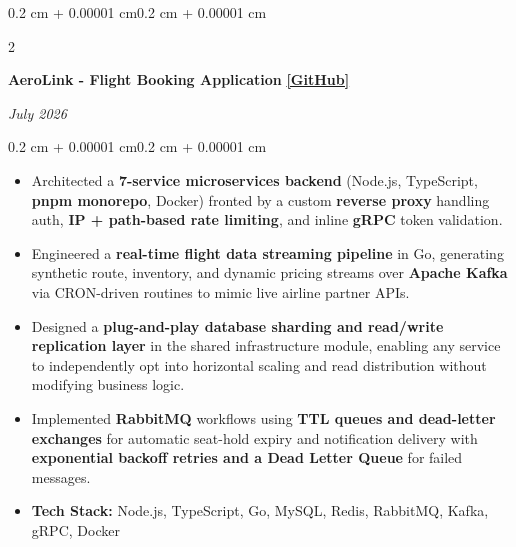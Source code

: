 \documentclass[10pt, letterpaper]{article}
\newenvironment{highlights}{
    \begin{itemize}[
        topsep=0.06 cm,
        parsep=0.06 cm,
        partopsep=0pt,
        itemsep=0pt,
        leftmargin=0.4 cm + 10pt
    ]
}{
    \end{itemize}
}
\newenvironment{onecolentry}{
    \begin{adjustwidth}{0.2 cm + 0.00001 cm}{0.2 cm + 0.00001 cm}
}{
    \end{adjustwidth}
}
\newenvironment{twocolentry}[2][]{
    \onecolentry
    \def\secondColumn{#2}
    \setcolumnwidth{\fill, 4.5 cm}
    \begin{paracol}{2}
}{
    \switchcolumn \raggedleft \secondColumn
    \end{paracol}
    \endonecolentry
}
\let\hrefWithoutArrow\href
\renewcommand{\href}[2]{\hrefWithoutArrow{#1}{\ifthenelse{\equal{#2}{}}{ }{#2 }\raisebox{.15ex}{\footnotesize \faExternalLink*}}}
\begin{document}
    \begin{twocolentry}{\textit{July 2026}}
        \textbf{AeroLink - Flight Booking Application} \quad
        \hrefWithoutArrow{https://github.com/AkshatRauthan/AeroLink}{\textbf{[GitHub]}}
    \end{twocolentry}
    \vspace{0.10 cm}
    \begin{onecolentry}
        \begin{highlights}
            \item Architected a \textbf{7-service microservices backend} (Node.js, TypeScript, \textbf{pnpm monorepo}, Docker) fronted by a custom \textbf{reverse 
                proxy} handling auth, \textbf{IP + path-based rate limiting}, and inline \textbf{gRPC} token validation.
            \item Engineered a \textbf{real-time flight data streaming pipeline} in Go, generating synthetic route, inventory, and dynamic pricing streams over 
                \textbf{Apache Kafka} via CRON-driven routines to mimic live airline partner APIs.
            \item Designed a \textbf{plug-and-play database sharding and read/write replication layer} in the shared infrastructure module, enabling any service 
                to independently opt into horizontal scaling and read distribution without modifying business logic.
            \item Implemented \textbf{RabbitMQ} workflows using \textbf{TTL queues and dead-letter exchanges} for automatic seat-hold expiry and notification 
                delivery with \textbf{exponential backoff retries and a Dead Letter Queue} for failed messages.
            \item \textbf{Tech Stack:} Node.js, TypeScript, Go, MySQL, Redis, RabbitMQ, Kafka, gRPC, Docker
        \end{highlights}
    \end{onecolentry}
    \vspace{0.3 cm}
\end{document}
